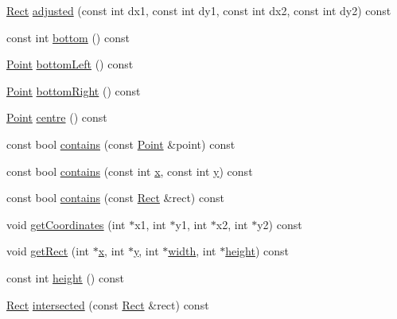 \begin{DoxyCompactItemize}
\hyperlink{classprism_1_1_rect}{Rect} \hyperlink{classprism_1_1_rect_aa0101c79f105eb2b988d3814e00be511}{adjusted} (const int dx1, const int dy1, const int dx2, const int dy2) const 
\item 
const int \hyperlink{classprism_1_1_rect_a8a6f1fbe20a10549a5ab9b85e04f209c}{bottom} () const 
\item 
\hyperlink{classprism_1_1_point}{Point} \hyperlink{classprism_1_1_rect_a561c86db589efaafbca149cdc11c5759}{bottom\+Left} () const 
\item 
\hyperlink{classprism_1_1_point}{Point} \hyperlink{classprism_1_1_rect_a97eb5a66441a49c7e149229376aba6a0}{bottom\+Right} () const 
\item 
\hyperlink{classprism_1_1_point}{Point} \hyperlink{classprism_1_1_rect_aacf848f3301590ab85fd803d72301af7}{centre} () const 
\item 
const bool \hyperlink{classprism_1_1_rect_a85cd85c5299edb5cc07cda4cf7733256}{contains} (const \hyperlink{classprism_1_1_point}{Point} \&point) const 
\item 
const bool \hyperlink{classprism_1_1_rect_ab92f880c4cb90b1aa382d8217d19d391}{contains} (const int \hyperlink{classprism_1_1_rect_a202fa9a56964c9111a968fb9b420f5f4}{x}, const int \hyperlink{classprism_1_1_rect_a6e951744e0bba0fed781b86ab0be680b}{y}) const 
\item 
const bool \hyperlink{classprism_1_1_rect_a64af57e3a62339a8b1760b51d5a76809}{contains} (const \hyperlink{classprism_1_1_rect}{Rect} \&rect) const 
\item 
void \hyperlink{classprism_1_1_rect_a20e7825273f653914b1e3bc9954e7deb}{get\+Coordinates} (int $\ast$x1, int $\ast$y1, int $\ast$x2, int $\ast$y2) const 
\item 
void \hyperlink{classprism_1_1_rect_a24f54f589f54d555c623c3db8a169047}{get\+Rect} (int $\ast$\hyperlink{classprism_1_1_rect_a202fa9a56964c9111a968fb9b420f5f4}{x}, int $\ast$\hyperlink{classprism_1_1_rect_a6e951744e0bba0fed781b86ab0be680b}{y}, int $\ast$\hyperlink{classprism_1_1_rect_a8dae47a50fdac7a5f7e8aabef68437aa}{width}, int $\ast$\hyperlink{classprism_1_1_rect_ad713f4536accdc6d5d2e6a6d83eac78b}{height}) const 
\item 
const int \hyperlink{classprism_1_1_rect_ad713f4536accdc6d5d2e6a6d83eac78b}{height} () const 
\item 
\hyperlink{classprism_1_1_rect}{Rect} \hyperlink{classprism_1_1_rect_a25ab32467c418ae6ee84df7ae759851a}{intersected} (const \hyperlink{classprism_1_1_rect}{Rect} \&rect) const 
\item 

\end{DoxyCompactItemize}
